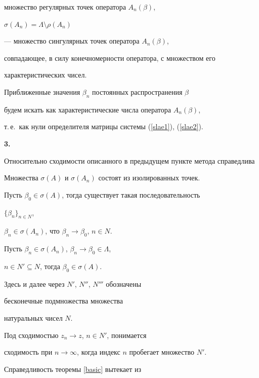 множество регулярных точек оператора $A_n(\beta)$,


$\sigma(A_n)=\Lambda\setminus \rho(A_n)$


--- множество сингулярных точек оператора $A_n(\beta)$,


совпадающее, в силу конечномерности оператора, с множеством его


характеристических чисел. 


Приближенные значения $\beta_n$ постоянных распространения $\beta$


будем искать как характеристические числа оператора $A_n(\beta)$,


т.\,е.~как нули определителя матрицы системы (\ref{slae1}), (\ref{slae2}).


\medskip





{\bf 3.}


Относительно сходимости описанного в предыдущем пункте метода справедлива 


\begin{thm}


\label{basic}


Множества $\sigma(A)$ и $\sigma(A_n)$ состоят из изолированных точек.


Пусть $\beta_0\in \sigma(A)$, тогда существует такая последовательность


$\{\beta_n \}_{n \in N}$, 


$\beta_n \in \sigma(A_n)$, что $\beta_n \to \beta_0$, $n \in N$.


Пусть $\beta_n \in \sigma(A_n)$, $\beta_n \to \beta_0\in \Lambda$, 


$n \in N'\subseteq N$, тогда $\beta_0 \in \sigma(A)$.


\end{thm}





Здесь и далее через $N'$, $N''$, $N'''$ обозначены 


бесконечные подмножества множества


натуральных чисел $N$.


Под сходимостью $z_n \to z$, $n\in N'$, понимается


сходимость при $n\to \infty$, когда индекс $n$ пробегает множество $N'$.





Справедливость теоремы \ref{basic} вытекает из


